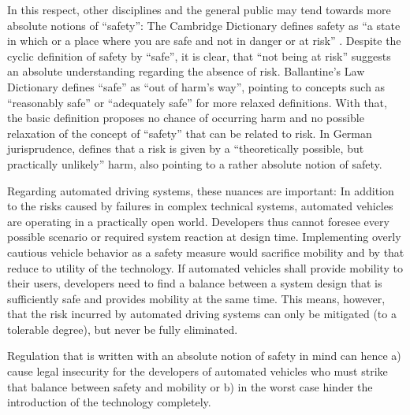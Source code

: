 In this respect, other disciplines and the general public may tend towards more absolute notions of ``safety'':
The Cambridge Dictionary defines safety as ``a state in which or a place where you are safe and not in danger or at risk'' \parencite{cambridge2025}.
Despite the cyclic definition of safety by ``safe'', it is clear, that ``not being at risk'' suggests an absolute understanding regarding the absence of risk.
Ballantine's Law Dictionary defines ``safe'' as ``out of harm's way'', pointing to concepts such as ``reasonably safe'' or ``adequately safe'' for more relaxed definitions.
With that, the basic definition proposes no chance of occurring harm and no possible relaxation of the concept of ``safety'' that can be related to risk.
In German jurisprudence, \parencite{peine1999} defines that a risk is given by a ``theoretically possible, but practically unlikely'' harm, also pointing to a rather absolute notion of safety.

Regarding automated driving systems, these nuances are important:
In addition to the risks caused by failures in complex technical systems, automated vehicles are operating in a practically open world. \parencite{nolte2024, koopman2024} 
Developers thus cannot foresee every possible scenario or required system reaction at design time.
Implementing overly cautious vehicle behavior as a safety measure would sacrifice mobility \parencite{graubohm2023} and by that reduce to utility of the technology.
If automated vehicles shall provide mobility to their users, developers need to find a balance between a system design that is sufficiently safe and provides mobility at the same time.
This means, however, that the risk incurred by automated driving systems can only be mitigated (to a tolerable degree), but never be fully eliminated.

Regulation that is written with an absolute notion of safety in mind can hence a) cause legal insecurity for the developers of automated vehicles who must strike that balance between safety and mobility or b) in the worst case hinder the introduction of the technology completely.









